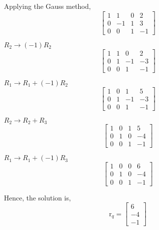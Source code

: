 \documentclass[a4paper]{article}
\begin{document}
\begin{qalist}
		Applying the Gauss method,
		\begin{equation}
			\left[\begin{array}{ccc|c}1 & 1 & 0 & 2\\ 0 & -1 & 1 & 3\\ 0 & 0 & 1 & -1\end{array}\right]
		\end{equation}
		
		${R}_{2} \rightarrow (-1){R}_{2}$
		\begin{equation}
			\left[\begin{array}{ccc|c}1 & 1 & 0 & 2\\ 0 & 1 & -1 & -3\\ 0 & 0 & 1 & -1\end{array}\right]
		\end{equation}
		
		${R}_{1} \rightarrow {R}_{1} + (-1){R}_{2}$
		\begin{equation}
			\left[\begin{array}{ccc|c}1 & 0 & 1 & 5\\ 0 & 1 & -1 & -3\\ 0 & 0 & 1 & -1\end{array}\right]
		\end{equation}
		
		${R}_{2} \rightarrow {R}_{2} + {R}_{3}$
		\begin{equation}
			\left[\begin{array}{ccc|c}1 & 0 & 1 & 5\\ 0 & 1 & 0 & -4\\ 0 & 0 & 1 & -1\end{array}\right]
		\end{equation}

		${R}_{1} \rightarrow {R}_{1} + (-1){R}_{3}$
		\begin{equation}
			\left[\begin{array}{ccc|c}1 & 0 & 0 & 6\\ 0 & 1 & 0 & -4\\ 0 & 0 & 1 & -1\end{array}\right]
		\end{equation}		
		
		Hence, the solution is, 
		\begin{equation}
			{\text{r}}_{q} = \begin{bmatrix}6 \\ -4 \\ -1\end{bmatrix}
		\end{equation}		


\end{qalist}
\end{document}

